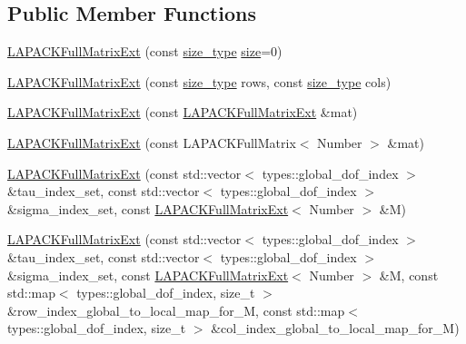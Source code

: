 \subsection*{Public Member Functions}
\begin{DoxyCompactItemize}
\item 
\hyperlink{classLAPACKFullMatrixExt_a1d2edf7f0eb1f079e1d9540f89b6584e}{L\+A\+P\+A\+C\+K\+Full\+Matrix\+Ext} (const \hyperlink{classLAPACKFullMatrixExt_a5cf5f4a6104dc17029210b5ca52bf574}{size\+\_\+type} \hyperlink{generic__functors_8h_add0dd2e12ca1b1712987b071d95d07d8}{size}=0)
\item 
\hyperlink{classLAPACKFullMatrixExt_a82986acedd4e702133151cb9a3ae2c97}{L\+A\+P\+A\+C\+K\+Full\+Matrix\+Ext} (const \hyperlink{classLAPACKFullMatrixExt_a5cf5f4a6104dc17029210b5ca52bf574}{size\+\_\+type} rows, const \hyperlink{classLAPACKFullMatrixExt_a5cf5f4a6104dc17029210b5ca52bf574}{size\+\_\+type} cols)
\item 
\hyperlink{classLAPACKFullMatrixExt_a95c6843f5138c51aa42b554ec843b717}{L\+A\+P\+A\+C\+K\+Full\+Matrix\+Ext} (const \hyperlink{classLAPACKFullMatrixExt}{L\+A\+P\+A\+C\+K\+Full\+Matrix\+Ext} \&mat)
\item 
\hyperlink{classLAPACKFullMatrixExt_adfb752e5770370e4f7ddbd298d873c60}{L\+A\+P\+A\+C\+K\+Full\+Matrix\+Ext} (const L\+A\+P\+A\+C\+K\+Full\+Matrix$<$ Number $>$ \&mat)
\item 
\hyperlink{classLAPACKFullMatrixExt_adcc17e75248175c5d89ba15ee58be954}{L\+A\+P\+A\+C\+K\+Full\+Matrix\+Ext} (const std\+::vector$<$ types\+::global\+\_\+dof\+\_\+index $>$ \&tau\+\_\+index\+\_\+set, const std\+::vector$<$ types\+::global\+\_\+dof\+\_\+index $>$ \&sigma\+\_\+index\+\_\+set, const \hyperlink{classLAPACKFullMatrixExt}{L\+A\+P\+A\+C\+K\+Full\+Matrix\+Ext}$<$ Number $>$ \&M)
\item 
\hyperlink{classLAPACKFullMatrixExt_a6ffdb7d0e8168100762813185480fb10}{L\+A\+P\+A\+C\+K\+Full\+Matrix\+Ext} (const std\+::vector$<$ types\+::global\+\_\+dof\+\_\+index $>$ \&tau\+\_\+index\+\_\+set, const std\+::vector$<$ types\+::global\+\_\+dof\+\_\+index $>$ \&sigma\+\_\+index\+\_\+set, const \hyperlink{classLAPACKFullMatrixExt}{L\+A\+P\+A\+C\+K\+Full\+Matrix\+Ext}$<$ Number $>$ \&M, const std\+::map$<$ types\+::global\+\_\+dof\+\_\+index, size\+\_\+t $>$ \&row\+\_\+index\+\_\+global\+\_\+to\+\_\+local\+\_\+map\+\_\+for\+\_\+M, const std\+::map$<$ types\+::global\+\_\+dof\+\_\+index, size\+\_\+t $>$ \&col\+\_\+index\+\_\+global\+\_\+to\+\_\+local\+\_\+map\+\_\+for\+\_\+M)
\item 

\end{DoxyCompactItemize}
